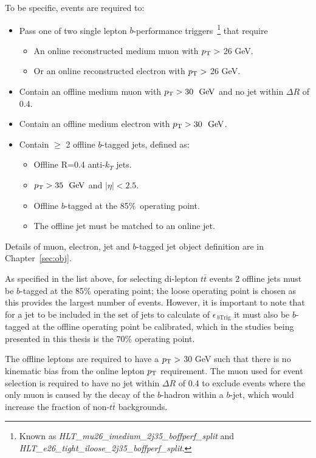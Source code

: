 \noindent
To be specific, events are required to:
\vspace{-1em}
\begin{itemize}
\item Pass one of two single lepton $b$-performance triggers~\footnote{Known as \textit{HLT\_mu26\_imedium\_2j35\_boffperf\_split} and \textit{HLT\_e26\_tight\_iloose\_2j35\_boffperf\_split}.}
  that require
    \begin{itemize}[label={$-$}]
    \item An online reconstructed medium muon with $p_{\mathrm{T}} >$ 26 GeV.
    \item Or an online reconstructed electron with $p_{\mathrm{T}} >$ 26 GeV.
    \end{itemize}
\item Contain an offline medium muon with $\pT>30~\GeV$ and no jet within $\Delta R$ of 0.4.
\item Contain an offline medium electron with $\pT>30~\GeV$.
\item Contain $\geq$ 2 offline $b$-tagged jets, defined as:
   \begin{itemize}[label={$-$}]
     \item Offline R=0.4 anti-$k_T$ jets.
     \item $\pT>35~\GeV$ and $|\eta|<2.5$.
     \item Offline $b$-tagged at the 85\%~operating point.
     \item The offline jet must be matched to an online jet.
    \end{itemize}
\end{itemize}
Details of muon, electron, jet and $b$-tagged jet object definition are in Chapter~\ref{sec:obj}.

As specified in the list above, for selecting di-lepton $t\bar{t}$ events 2 offline jets must be $b$-tagged at the 85\% operating point;
the loose operating point is chosen as this provides the largest number of events.
However, it is important to note that for a jet to be included in the set of jets to calculate of $\epsilon_{\,b\text{Trig}}$
it must also be $b$-tagged at the offline operating point be calibrated,
which in the studies being presented in this thesis is the 70\% operating point.

The offline leptons are required to have a $p_{\mathrm{T}} >$ 30 GeV such that there is no kinematic bias from the online lepton $p_{\mathrm{T}}$ requirement. 
The muon used for event selection is required to have no jet within  $\Delta R$ of 0.4 to exclude %
events where the only muon is caused by the decay of the $b$-hadron within a $b$-jet, which would increase the fraction of non-$t\bar{t}$ backgrounds.

